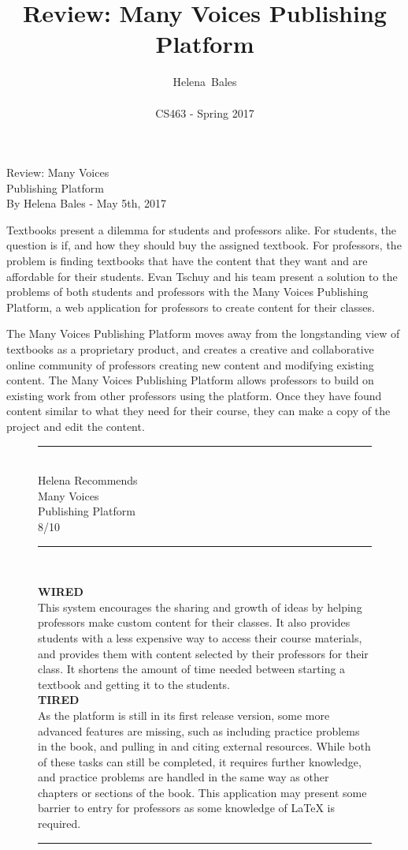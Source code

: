 \documentclass[letterpaper,10pt]{article}
\title{Review: Many Voices Publishing Platform}
\author{Helena~Bales\\ \\ CS463 - Spring 2017}
\begin{document}
\huge{Review: Many Voices\\ Publishing Platform}\\
\large{By Helena Bales - May 5th, 2017}\\

\normalsize{
Textbooks present a dilemma for students and professors alike. For students, the question is if, and 
how they should buy the assigned textbook. For professors, the problem is finding textbooks that have 
the content that they want and are affordable for their students. Evan Tschuy and his team present a 
solution to the problems of both students and professors with the Many Voices Publishing Platform, a 
web application for professors to create content for their classes.

The Many Voices Publishing Platform moves away from the longstanding view of textbooks as a 
proprietary product, and creates a creative and collaborative online community of professors creating 
new content and modifying existing content. The Many Voices Publishing Platform allows professors to 
build on existing work from other professors using the platform. Once they have found content similar 
to what they need for their course, they can make a copy of the project and edit the content.
}

\begin{figure}[ht]
\noindent\rule{6cm}{0.4pt}\\
\large{Helena Recommends}\\
\Large{Many Voices\\ Publishing Platform}\\
\large{8/10}\\
\noindent\rule{6cm}{0.4pt}\\

\normalsize{
\textbf{WIRED}\\
This system encourages the sharing and growth of ideas by helping professors make custom content for 
their classes. It also provides students with a less expensive way to access their course materials, and provides them with content selected by their professors for their class. It shortens the amount of time needed between starting a textbook and getting it to the students.\\

\textbf{TIRED}\\
As the platform is still in its first release version, some more advanced features are missing, such 
as including practice problems in the book, and pulling in and citing external resources. While both 
of these tasks can still be completed, it requires further knowledge, and practice problems are 
handled in the same way as other chapters or sections of the book. This application may present some 
barrier to entry for professors as some knowledge of LaTeX is required.\\
\restoregeometry
\noindent\rule{6cm}{0.4pt}\\
}
\label{fig:Recommendation}
\end{figure}
\end{document}
